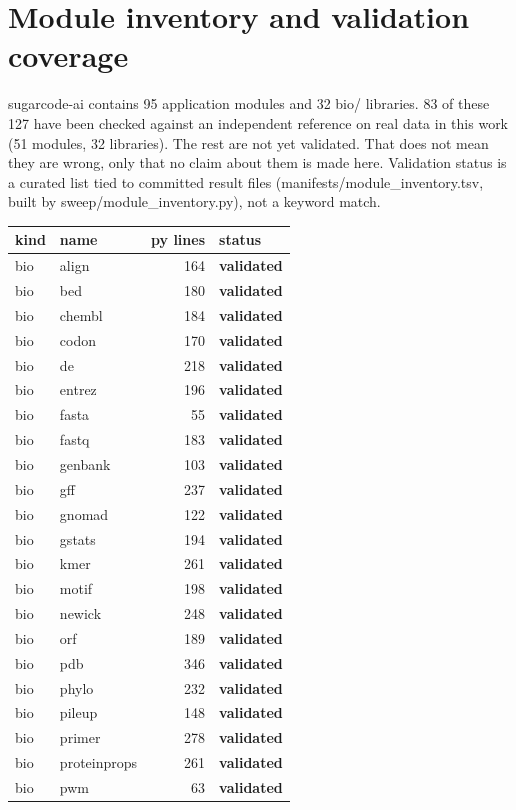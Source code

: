 \section{Module inventory and validation coverage}
sugarcode-ai contains 95 application modules and 32 bio/ libraries. 83 of these 127 have been checked against an independent reference on real data in this work (51 modules, 32 libraries). The rest are not yet validated. That does not mean they are wrong, only that no claim about them is made here. Validation status is a curated list tied to committed result files (manifests/module\_inventory.tsv, built by sweep/module\_inventory.py), not a keyword match.
\begin{center}\scriptsize\begin{longtable}{llrl}\hline kind & name & py lines & status\\\hline\endhead
bio & align & 164 & \textbf{validated}\\
bio & bed & 180 & \textbf{validated}\\
bio & chembl & 184 & \textbf{validated}\\
bio & codon & 170 & \textbf{validated}\\
bio & de & 218 & \textbf{validated}\\
bio & entrez & 196 & \textbf{validated}\\
bio & fasta & 55 & \textbf{validated}\\
bio & fastq & 183 & \textbf{validated}\\
bio & genbank & 103 & \textbf{validated}\\
bio & gff & 237 & \textbf{validated}\\
bio & gnomad & 122 & \textbf{validated}\\
bio & gstats & 194 & \textbf{validated}\\
bio & kmer & 261 & \textbf{validated}\\
bio & motif & 198 & \textbf{validated}\\
bio & newick & 248 & \textbf{validated}\\
bio & orf & 189 & \textbf{validated}\\
bio & pdb & 346 & \textbf{validated}\\
bio & phylo & 232 & \textbf{validated}\\
bio & pileup & 148 & \textbf{validated}\\
bio & primer & 278 & \textbf{validated}\\
bio & proteinprops & 261 & \textbf{validated}\\
bio & pwm & 63 & \textbf{validated}\\

\end{longtable}
\end{center}
